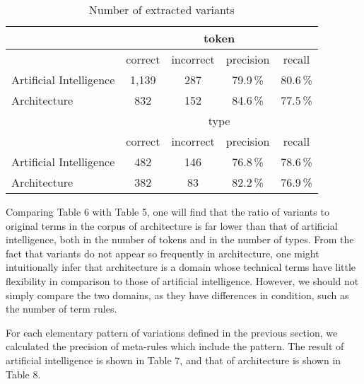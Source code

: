 \begin{table*}[htb]
\begin{center}
\begin{tabular}{l|ccc|c}
\hline
& \multicolumn{4}{|c}{token}\\
\hline
& correct & incorrect & precision & recall\\
\hline
\hline
Artificial Intelligence & 1,139 & 287 & 79.9\,\% & 80.6\,\%\\
Architecture & 832 & 152 & 84.6\,\% & 77.5\,\%\\
\hline
\hline
& \multicolumn{4}{|c}{type}\\
\hline
& correct & incorrect & precision & recall\\
\hline
\hline
Artificial Intelligence & 482 & 146 & 76.8\,\% & 78.6\,\%\\
Architecture & 382 & 83 & 82.2\,\% & 76.9\,\%\\
\hline
\end{tabular}

\end{center}
\caption{Number of extracted variants}
\end{table*}

Comparing Table 6 with Table 5, one will find that the ratio of variants to original terms in the corpus of architecture is far lower than that of artificial intelligence, both in the number of tokens and in the number of types. From the fact that variants do not appear so frequently in architecture, one might intuitionally infer that architecture is a domain whose technical terms have little flexibility in comparison to those of artificial intelligence. However, we should not simply compare the two domains, as they have differences in condition, such as the number of term rules.

For each elementary pattern of variations defined in the previous section, we calculated the precision of meta-rules which include the pattern. The result of artificial intelligence is shown in Table 7, and that of architecture is shown in Table 8.

